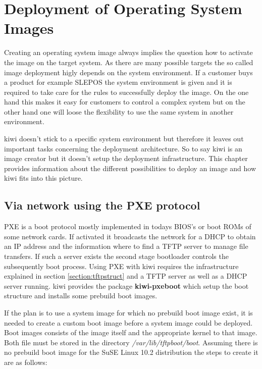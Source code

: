 \chapter{Deployment of Operating System Images}
\label{chapter:dpopsysimg}
\minitoc

Creating an operating system image always implies the question
how to activate the image on the target system. As there are many
possible targets the so called image deployment higly depends on
the system environment. If a customer buys a product for example SLEPOS
the system environment is given and it is required to take care for the
rules to successfully deploy the image. On the one hand this
makes it easy for customers to control a complex system but on
the other hand one will loose the flexibility to use the same
system in another environment.

kiwi doesn't stick to a specific system environment but therefore
it leaves out important tasks concerning the deployment architecture.
So to say kiwi is an image creator but it doesn't setup the
deployment infrastructure. This chapter provides information about
the different possibilities to deploy an image and how kiwi fits
into this picture.

\section{Via network using the PXE protocol}
PXE is a boot protocol mostly implemented in todays BIOS's or
boot ROMs of some network cards. If activated it broadcasts the
network for a DHCP to obtain an IP address and the information
where to find a TFTP server to manage file transfers. If such a server
exists the second stage bootloader controls the subsequently
boot process. Using PXE with kiwi requires the infrastructure
explained in section \ref{section:tftpstruct} and a TFTP server
as well as a DHCP server running. kiwi provides the package
\textbf{kiwi-pxeboot} which setup the boot structure and installs
some prebuild boot images.

If the plan is to use a system image for which no prebuild boot image
exist, it is needed to create a custom boot image before a system image
could be deployed. Boot images consists of the image itself and
the appropriate kernel to that image. Both file must be stored in
the directory \textit{/var/lib/tftpboot/boot}. Assuming there is no
prebuild boot image for the SuSE Linux 10.2 distribution the steps
to create it are as follows:

